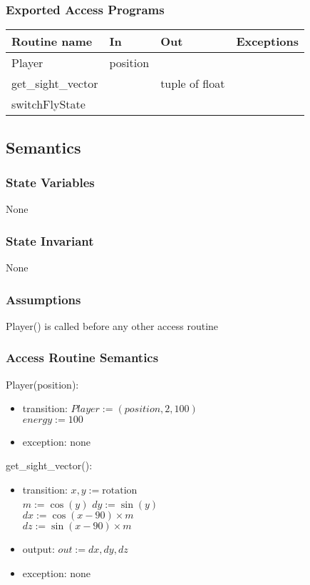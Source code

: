 \documentclass{article}
\begin{document}
\subsubsection {Exported Access Programs}
\begin{table}[!htbp]
\begin{tabular}{| l | l | l | l |}
\hline
\textbf{Routine name} & \textbf{In} & \textbf{Out} & \textbf{Exceptions}\\
\hline
Player & position & ~ & ~\\
\hline
get\_sight\_vector & ~ & tuple of float & ~\\
\hline
switchFlyState&~&~&~\\
\hline
\end{tabular}

\end{table}
\FloatBarrier

\subsection {Semantics}

\subsubsection {State Variables}
None

\subsubsection {State Invariant}
None

\subsubsection {Assumptions}

Player() is called before any other access routine

\subsubsection {Access Routine Semantics}
\noindent Player(position):
\begin{itemize}
\item transition: $Player := (position, 2, 100)$\\
    $energy := 100$
\item exception: none
\end{itemize}\vspace{6mm}

\noindent get\_sight\_vector():
\begin{itemize}
\item transition: $x, y := \text{rotation}$\\
    $m := \cos(y)$
    $dy := \sin(y)$\\
    $dx := \cos(x - 90) \times m$\\
    $dz := \sin(x - 90) \times m$
\item output: $out:=dx,dy,dz$
\item exception: none
\end{itemize}\vspace{6mm}
\end{document}
